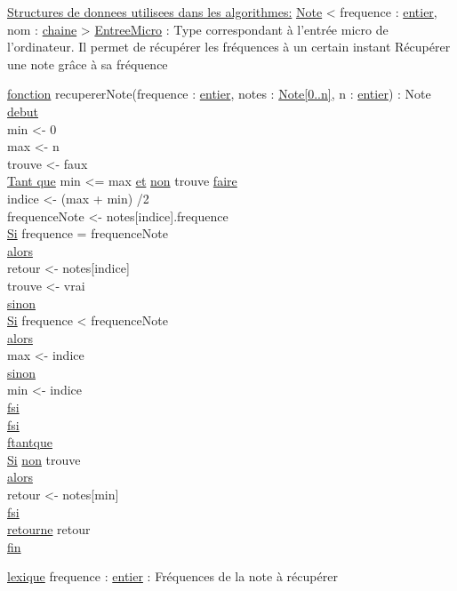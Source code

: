 \ul{Structures de donnees utilisees dans les algorithmes:}\newline
\ul{Note} < frequence : \ul{entier}, nom : \ul{chaine} >\newline
\ul{EntreeMicro} : Type correspondant à l'entrée micro de l'ordinateur. Il permet de récupérer les fréquences à un certain instant\newline
Récupérer une note grâce à sa fréquence\newline
\begin{tabbing}
\ul{fonction} recupererNote(frequence : \ul{entier}, notes : \ul{Note[0..n]}, n : \ul{entier}) : Note\\
\ul{debut}\\
min <- 0\\
max <- n\\
trouve <- faux\\
\ul{Tant que} min <= max \ul{et} \ul{non} trouve \ul{faire}\\
    indice <- (max + min) /2 \\
    frequenceNote <- notes[indice].frequence\\
    \ul{Si} frequence = frequenceNote\\
    \ul{alors}\\
        retour <- notes[indice]\\
        trouve <- vrai\\
    \ul{sinon}\\
        \ul{Si} frequence < frequenceNote\\
        \ul{alors}\\
            max <- indice\\
        \ul{sinon}\\
            min <- indice\\
        \ul{fsi}\\
    \ul{fsi}\\
\ul{ftantque}\\
\ul{Si} \ul{non} trouve\\
\ul{alors}\\
    retour <- notes[min]\\
\ul{fsi}\\
\ul{retourne} retour\\
\ul{fin}\\
\end{tabbing}
\ul{lexique}\newline
frequence : \ul{entier} : Fréquences de la note à récupérer\newline
